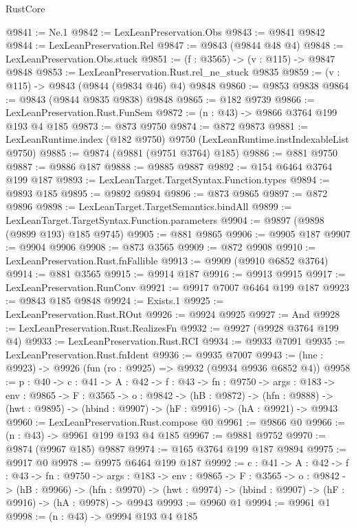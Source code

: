 \begin{lexlean}{RustCore}
\begin{coremodule}
@9841 := Ne.{1}
@9842 := LexLeanPreservation.Obs
@9843 := @9841 @9842
@9844 := LexLeanPreservation.Rel
@9847 := @9843 (@9844 @48 @4)
@9848 := LexLeanPreservation.Obs.stuck
@9851 := (f : @3565) -> (v : @115) -> @9847 @9848
@9853 := LexLeanPreservation.Rust.rel_ne_stuck @9835
@9859 := (v : @115) -> @9843 (@9844 (@9834 @46) @4) @9848
@9860 := @9853 @9838
@9864 := @9843 (@9844 @9835 @9838) @9848
@9865 := @182 @9739
@9866 := LexLeanPreservation.Rust.FunSem
@9872 := (n : @43) -> @9866 @3764 @199 @193 @4 @185
@9873 := @873 @9750
@9874 := @872 @9873
@9881 := LexLeanRuntime.index (@182 @9750) @9750 (LexLeanRuntime.instIndexableList @9750)
@9885 := @9874 (@9881 (@9751 @3764) @185)
@9886 := @881 @9750
@9887 := @9886 @187
@9888 := @9885 @9887
@9892 := @154 @6464 @3764 @199 @187
@9893 := LexLeanTarget.TargetSyntax.Function.types
@9894 := @9893 @185
@9895 := @9892 @9894
@9896 := @873 @9865
@9897 := @872 @9896
@9898 := LexLeanTarget.TargetSemantics.bindAll
@9899 := LexLeanTarget.TargetSyntax.Function.parameters
@9904 := @9897 (@9898 (@9899 @193) @185 @9745)
@9905 := @881 @9865
@9906 := @9905 @187
@9907 := @9904 @9906
@9908 := @873 @3565
@9909 := @872 @9908
@9910 := LexLeanPreservation.Rust.fnFallible
@9913 := @9909 (@9910 @6852 @3764)
@9914 := @881 @3565
@9915 := @9914 @187
@9916 := @9913 @9915
@9917 := LexLeanPreservation.RunConv
@9921 := @9917 @7007 @6464 @199 @187
@9923 := @9843 @185 @9848
@9924 := Exists.{1}
@9925 := LexLeanPreservation.Rust.ROut
@9926 := @9924 @9925
@9927 := And
@9928 := LexLeanPreservation.Rust.RealizesFn
@9932 := @9927 (@9928 @3764 @199 @4)
@9933 := LexLeanPreservation.Rust.RCI
@9934 := @9933 @7091
@9935 := LexLeanPreservation.Rust.fnIdent
@9936 := @9935 @7007
@9943 := (hne : @9923) -> @9926 (fun (ro : @9925) => @9932 (@9934 @9936 @6852 @4))
@9958 := {p : @40} ->
  {c : @41} ->
  {A : @42} ->
  {f : @43} ->
  {fn : @9750} ->
  {args : @183} ->
  {env : @9865} ->
  {F : @3565} ->
  {o : @9842} ->
  (hB : @9872) ->
  (hfn : @9888) -> (hwt : @9895) -> (hbind : @9907) -> (hF : @9916) -> (hA : @9921) -> @9943
@9960 := LexLeanPreservation.Rust.compose @0
@9961 := @9866 @0
@9966 := (n : @43) -> @9961 @199 @193 @4 @185
@9967 := @9881 @9752
@9970 := @9874 (@9967 @185) @9887
@9974 := @165 @3764 @199 @187 @9894
@9975 := @9917 @0
@9978 := @9975 @6464 @199 @187
@9992 := {c : @41} ->
  {A : @42} ->
  {f : @43} ->
  {fn : @9750} ->
  {args : @183} ->
  {env : @9865} ->
  {F : @3565} ->
  {o : @9842} ->
  (hB : @9966) ->
  (hfn : @9970) -> (hwt : @9974) -> (hbind : @9907) -> (hF : @9916) -> (hA : @9978) -> @9943
@9993 := @9960 @1
@9994 := @9961 @1
@9998 := (n : @43) -> @9994 @193 @4 @185

\end{coremodule}
\end{lexlean}
